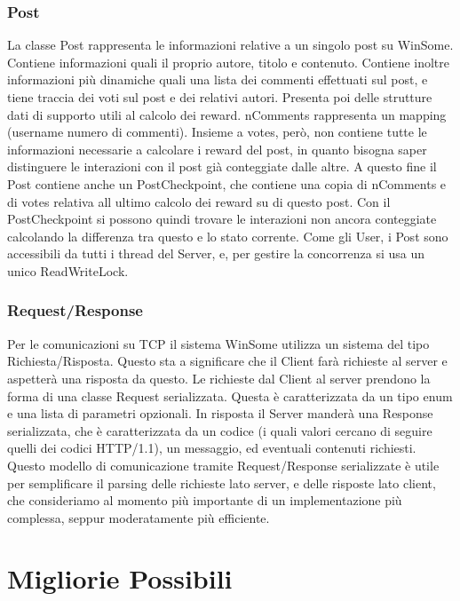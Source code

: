 \documentclass[11pt]{article}
\begin{document}
\begin{flushleft}
\subsubsection{Post}

La classe Post rappresenta le informazioni relative a un singolo post su WinSome.
Contiene informazioni quali il proprio autore, titolo e contenuto. Contiene inoltre informazioni più dinamiche quali una lista dei commenti effettuati sul post, e tiene traccia dei voti sul post e dei relativi autori.
Presenta poi delle strutture dati di supporto utili al calcolo dei reward. nComments rappresenta un mapping (username \textrightarrow \space numero di commenti). Insieme a votes, però, non contiene tutte le informazioni necessarie a calcolare i reward del post, in quanto bisogna saper distinguere le interazioni con il post già conteggiate dalle altre. A questo fine il Post contiene anche un PostCheckpoint, che contiene una copia di nComments e di votes relativa all ultimo calcolo dei reward su di questo post. Con il PostCheckpoint si possono quindi trovare le interazioni non ancora conteggiate calcolando la differenza tra questo e lo stato corrente.
Come gli User, i Post sono accessibili da tutti i thread del Server, e, per gestire la concorrenza si usa un unico ReadWriteLock.

\subsubsection{Request/Response}

Per le comunicazioni su TCP il sistema WinSome utilizza un sistema del tipo Richiesta/Risposta. Questo sta a significare che il Client farà richieste al server e aspetterà una risposta da questo.
Le richieste dal Client al server prendono la forma di una classe Request serializzata. Questa è caratterizzata da un tipo enum e una lista di parametri opzionali. In risposta il Server manderà una Response serializzata, che è caratterizzata da un codice (i quali valori cercano di seguire quelli dei codici HTTP/1.1), un messaggio, ed eventuali contenuti richiesti.
Questo modello di comunicazione tramite Request/Response serializzate è utile per semplificare il parsing delle richieste lato server, e delle risposte lato client, che consideriamo al momento più importante di un implementazione più complessa, seppur moderatamente più efficiente.


\section{Migliorie Possibili}


\end{flushleft}
\end{document}
